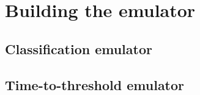 \section{Building the emulator}

\subsection{Classification emulator}

\subsection{Time-to-threshold emulator}



